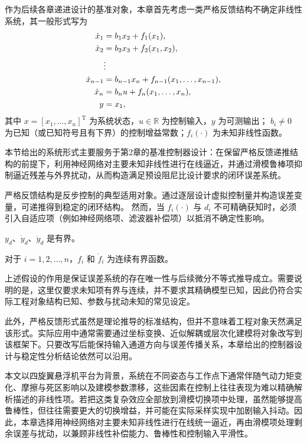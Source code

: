 作为后续各章递进设计的基准对象，本章首先考虑一类严格反馈结构不确定非线性系统，其一般形式写为
\begin{subequations}\label{eq:sf_system}
\begin{align}
  \dot{x}_1 &= b_1 x_2 + f_1(x_1),\\
  \dot{x}_2 &= b_2 x_3 + f_2(x_1,x_2),\\
  &\notag \vdots\\
  \dot{x}_{n-1} &= b_{n-1} x_n + f_{n-1}(x_1,\dots,x_{n-1}),\\
  \dot{x}_n &= b_n u + f_n(x_1,\dots,x_n),\\
  y &= x_1,
\end{align}
\end{subequations}
其中 $x=[x_1,\dots,x_n]^{\mathrm T}$ 为系统状态，$u\in\mathbb{R}$ 为控制输入，$y$ 为可测输出；
$b_i\neq 0$ 为已知（或已知符号且有下界）的控制增益常数；$f_i(\cdot)$ 为未知非线性函数。

本节给出的系统形式主要服务于第2章的基准控制器设计：在保留严格反馈递推结构的前提下，利用神经网络对主要未知非线性进行在线逼近，并通过滑模鲁棒项抑制逼近残差与外界扰动，从而构造满足预设阻尼比设计要求的闭环误差系统。

严格反馈结构是反步控制的典型适用对象。通过逐层设计虚拟控制量并构造误差变量，可递推得到稳定的闭环结构。
然而，当 $f_i(\cdot)$ 与 $d_i$ 不可精确获知时，必须引入自适应项（例如神经网络项、滤波器补偿项）以抵消不确定性影响。


\begin{assumption}\label{assump:yd}
 $y_d$、$\dot{y}_d$、$\ddot{y}_d$ 是有界。
\end{assumption}

\begin{assumption}\label{assump:fi}
 对于 $i=1,2,\ldots,n$，$f_i$ 和 $\dot f_i$ 为连续有界函数。
\end{assumption}

上述假设的作用是保证误差系统的存在唯一性与后续微分不等式推导成立。需要说明的是，这里仅要求未知项有界与连续，并不要求其精确模型已知，因此仍符合实际工程对象结构已知、参数与扰动未知的常见设定。

此外，严格反馈形式虽然是理论推导的标准结构，但并不意味着工程对象天然满足该形式。实际应用中通常需要通过坐标变换、近似解耦或层次化建模将对象改写到该框架下。只要改写后能保持输入通道方向与误差传播关系，本章给出的控制器设计与稳定性分析结论依然可以沿用。

本文以四旋翼悬浮机平台为背景，系统在不同姿态与工作点下通常伴随气动力矩变化、摩擦与死区影响以及建模参数漂移，这些因素在控制上往往表现为难以精确解析描述的非线性项。若把这类复杂效应全部放到滑模切换项中处理，虽然能够提高鲁棒性，但往往需要更大的切换增益，并可能在实际采样实现中加剧输入抖动。因此，本章选择用神经网络对主要未知非线性进行在线统一逼近，再由滑模项处理剩余误差与扰动，以兼顾非线性补偿能力、鲁棒性和控制输入平滑性。

